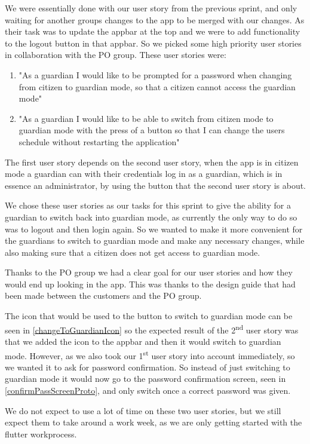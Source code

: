 We were essentially done with our user story from the previous sprint, and only waiting for another groups changes to the app to be merged with our changes. 
As their task was to update the appbar at the top and we were to add functionality to the logout button in that appbar.
So we picked some high priority user stories in collaboration with the PO group.
These user stories were:

\begin{enumerate}
\item "As a guardian I would like to be prompted for a password when changing from citizen to guardian mode, so that a citizen cannot access the guardian mode"
\item "As a guardian I would like to be able to switch from citizen mode to guardian mode with the press of a button so that I can change the users schedule without restarting the application"
\end{enumerate}

The first user story depends on the second user story, when the app is in citizen mode a guardian can with their credentials log in as a guardian, which is in essence an administrator, by using the button that the second user story is about. 

We chose these user stories as our tasks for this sprint to give the ability for a guardian to switch back into guardian mode, as currently the only way to do so was to logout and then login again. 
So we wanted to make it more convenient for the guardians to switch to guardian mode and make any necessary changes, while also making sure that a citizen does not get access to guardian mode.

Thanks to the PO group we had a clear goal for our user stories and how they would end up looking in the app. 
This was thanks to the design guide that had been made between the customers and the PO group.

The icon that would be used to the button to switch to guardian mode can be seen in \ref{changeToGuardianIcon} so the expected result of the 2\textsuperscript{nd} user story was that we added the icon to the appbar and then it would switch to guardian mode. 
However, as we also took our 1\textsuperscript{st} user story into account immediately, so we wanted it to ask for password confirmation. 
So instead of just switching to guardian mode it would now go to the password confirmation screen, seen in \ref{confirmPassScreenProto}, and only switch once a correct password was given.


We do not expect to use a lot of time on these two user stories, but we still expect them to take around a work week, as we are only getting started with the flutter workprocess.
